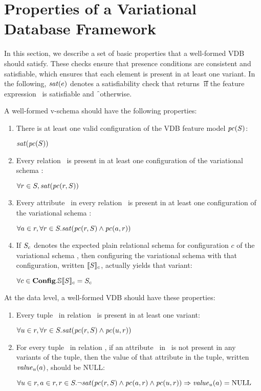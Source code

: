 \section{Properties of a Variational Database Framework}
\label{sec:vdbfprop}


In this section, we describe a set of basic properties that a well-formed VDB
should satisfy.
%
These checks ensure that presence conditions are consistent and satisfiable,
which ensures that each element is present in at least one variant.
%
In the following, $\sat\dimMeta$ denotes a satisfiability check
that returns \t\ if the feature expression \dimMeta\ is satisfiable and \f\
otherwise.


A well-formed v-schema should have the following properties:
%
\begin{enumerate}
%
\item There is at least one valid configuration of the VDB feature model $\getPC \vSch$:\\
%
\centerline{
$\sat {\getPC \vSch}$}
%
\item Every relation \vRel\ is present in at least one configuration of the
variational schema \vSch:\\
%
\centerline{
$\forall\vRel\in\vSch, \sat{\getPCfrom \vRel \vSch}$}
%
\item Every attribute \vAtt\ in every relation \vRel\ is present in at least one
configuration of the variational schema \vSch:\\
%
\centerline{
$\forall\vAtt\in\vRel, \forall\vRel\in\vSch.
\sat{\getPCfrom \vRel \vSch \wedge\getPCfrom \vAtt \vRel}$}
%
\item If $\vSch_\config$ denotes the expected plain relational schema for
configuration $c$ of the variational schema \vSch, then configuring the
variational schema with that configuration, written $\sem[\config]{\vSch}$,
actually yields that variant:\\
%
\centerline{
$\forall\config\in\confSet. \osSem {\vSch} = \vSch_\config$}
%
\end{enumerate}


\noindent
%
At the data level, a well-formed VDB should have these properties:
%
\begin{enumerate}
%
\item Every tuple \vTuple\ in relation \vRel\ is present in at least one variant:\\
%
\centerline{
$\forall\vTuple\in\vRel, \forall\vRel\in\vSch.
\sat{\getPCfrom\vRel \vSch\wedge\getPCfrom \vTuple \vRel}$ }
%
\item For every tuple \vTuple\ in relation \vRel, if an attribute \vAtt\ in \vRel\ is
not present in any variants of the tuple, then the value of that attribute in
the tuple, written $\mathit{value}_\vTuple(\vAtt)$, should be NULL:\\
\centerline{
$\forall\vTuple\in\vRel, \vAtt\in\vRel, \vRel\in\vSch.
\neg\sat{\getPCfrom \vRel \vSch \wedge\getPCfrom \vAtt \vRel\wedge\getPCfrom \vTuple \vRel}
\Rightarrow \mathit{value}_\vTuple(\vAtt) = \text{NULL}$}
%
\end{enumerate}


